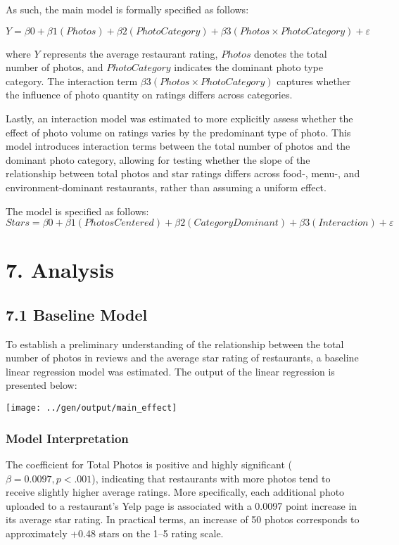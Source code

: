 \documentclass[
]{article}
\begin{document}
As such, the main model is formally specified as follows:

\(Y=β0+β1(Photos)+β 2(Photo Category)+β3(Photos×Photo Category)+ε\)

where \(Y\) represents the average restaurant rating, \(Photos\) denotes
the total number of photos, and \(Photo Category\) indicates the
dominant photo type category. The interaction term
\(β3(Photos×Photo Category)\) captures whether the influence of photo
quantity on ratings differs across categories.

Lastly, an interaction model was estimated to more explicitly assess
whether the effect of photo volume on ratings varies by the predominant
type of photo. This model introduces interaction terms between the total
number of photos and the dominant photo category, allowing for testing
whether the slope of the relationship between total photos and star
ratings differs across food-, menu-, and environment-dominant
restaurants, rather than assuming a uniform effect.

The model is specified as follows:
\(Stars=β0​+β1​(Photos Centered)+β2​(Category Dominant)+β3​(Interaction)+ε\)

\section{7. Analysis}\label{analysis}

\subsection{7.1 Baseline Model}\label{baseline-model}

To establish a preliminary understanding of the relationship between the
total number of photos in reviews and the average star rating of
restaurants, a baseline linear regression model was estimated. The
output of the linear regression is presented below:

\begin{center}\texttt{[image: ../gen/output/main\_effect]} \end{center}

\subsubsection{Model Interpretation}\label{model-interpretation}

The coefficient for Total Photos is positive and highly significant
(\(β = 0.0097, p < .001\)), indicating that restaurants with more photos
tend to receive slightly higher average ratings. More specifically, each
additional photo uploaded to a restaurant's Yelp page is associated with
a 0.0097 point increase in its average star rating. In practical terms,
an increase of 50 photos corresponds to approximately +0.48 stars on the
1--5 rating scale.
\end{document}
